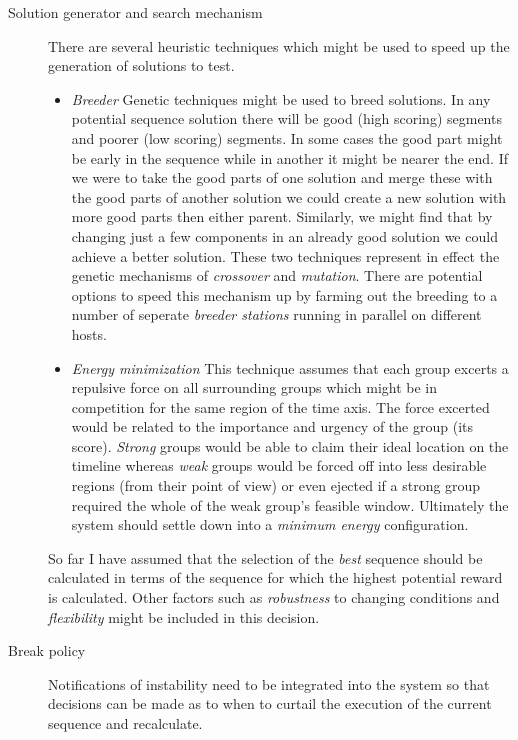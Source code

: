 \begin{description}

 \item [Solution generator and search mechanism]
There are several heuristic techniques which might be used to speed up the generation of solutions to test.

\begin{itemize}
\item \emph{Breeder} Genetic techniques might be used to breed solutions. In any potential sequence solution there will be good (high scoring) segments and poorer (low scoring) segments. In some cases the good part might be early in the sequence while in another it might be nearer the end. If we were to take the good parts of one solution and merge these with the good parts of another solution we could create a new solution with more good parts then either parent. Similarly, we might find that by changing just a few components in an already good solution we could achieve a better solution. These two techniques represent in effect the genetic mechanisms of \emph{crossover} and \emph{mutation}. There are potential options to speed this mechanism up by farming out the breeding to a number of seperate \emph{breeder stations} running in parallel on different hosts.

\item \emph{Energy minimization} This technique assumes that each group excerts a repulsive force on all surrounding groups which might be in competition for the same region of the time axis. The force excerted would be related to the importance and urgency of the group (its score). \emph{Strong} groups would be able to claim their ideal location on the timeline whereas \emph{weak} groups would be forced off into less desirable regions (from their point of view) or even ejected if a strong group required the whole of the weak group's feasible window. Ultimately the system should settle down into a \emph{minimum energy} configuration.

\end{itemize}

So far I have assumed that the selection of the \emph{best} sequence should be calculated in terms of the sequence for which the highest potential reward is calculated. Other factors such as \emph{robustness} to changing conditions and \emph{flexibility} might be included in this decision.


 \item [Break policy]
Notifications of instability need to be integrated into the system so that decisions can be made as to when to curtail the execution of the current sequence and recalculate.


\end{description}
